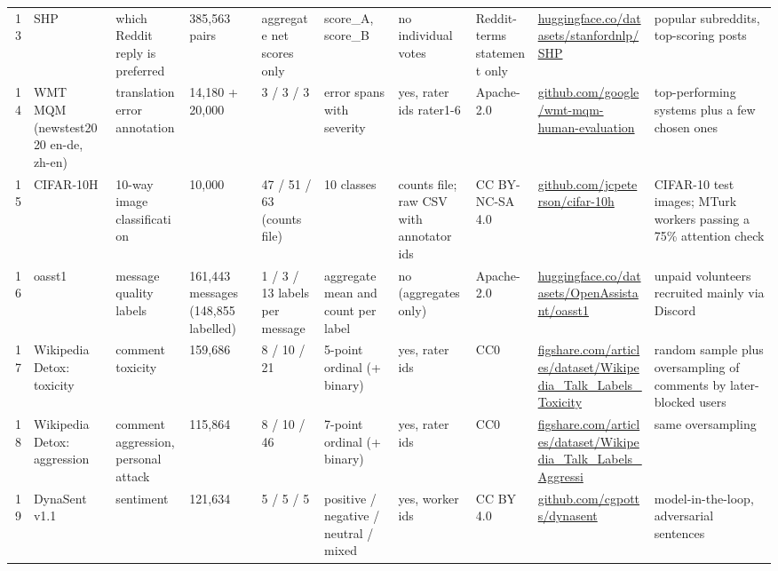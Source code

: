 \documentclass[10pt]{article}
\begin{document}
\begin{longtable}{@{}r p{1.15in} p{1.0in} p{0.75in} p{0.8in} p{0.8in} p{0.9in} p{0.8in} p{1.2in} p{1.5in}@{}}
13 & SHP & which Reddit reply is preferred & 385,563 pairs & aggregate net scores only & score\_A, score\_B & no individual votes & Reddit-terms statement only & \href{https://huggingface.co/datasets/stanfordnlp/SHP}{huggingface.co/\allowbreak{}datasets/\allowbreak{}stanfordnlp/\allowbreak{}SHP} & popular subreddits, top-scoring posts \\
14 & WMT MQM (newstest2020 en-de, zh-en) & translation error annotation & 14,180 + 20,000 & 3 / 3 / 3 & error spans with severity & yes, rater ids rater1-6 & Apache-2.0 & \href{https://github.com/google/wmt-mqm-human-evaluation}{github.com/\allowbreak{}google/\allowbreak{}wmt-\allowbreak{}mqm-\allowbreak{}human-\allowbreak{}evaluation} & top-performing systems plus a few chosen ones \\
15 & CIFAR-10H & 10-way image classification & 10,000 & 47 / 51 / 63 (counts file) & 10 classes & counts file; raw CSV with annotator ids & CC BY-NC-SA 4.0 & \href{https://github.com/jcpeterson/cifar-10h}{github.com/\allowbreak{}jcpeterson/\allowbreak{}cifar-\allowbreak{}10h} & CIFAR-10 test images; MTurk workers passing a 75\% attention check \\
16 & oasst1 & message quality labels & 161,443 messages (148,855 labelled) & 1 / 3 / 13 labels per message & aggregate mean and count per label & no (aggregates only) & Apache-2.0 & \href{https://huggingface.co/datasets/OpenAssistant/oasst1}{huggingface.co/\allowbreak{}datasets/\allowbreak{}OpenAssistant/\allowbreak{}oasst1} & unpaid volunteers recruited mainly via Discord \\
17 & Wikipedia Detox: toxicity & comment toxicity & 159,686 & 8 / 10 / 21 & 5-point ordinal (+ binary) & yes, rater ids & CC0 & \href{https://figshare.com/articles/dataset/Wikipedia_Talk_Labels_Toxicity/4563973}{figshare.com/\allowbreak{}articles/\allowbreak{}dataset/\allowbreak{}Wikipedia\_Talk\_Labels\_Toxicity} & random sample plus oversampling of comments by later-blocked users \\
18 & Wikipedia Detox: aggression & comment aggression, personal attack & 115,864 & 8 / 10 / 46 & 7-point ordinal (+ binary) & yes, rater ids & CC0 & \href{https://figshare.com/articles/dataset/Wikipedia_Talk_Labels_Aggression/4267550}{figshare.com/\allowbreak{}articles/\allowbreak{}dataset/\allowbreak{}Wikipedia\_Talk\_Labels\_Aggressi} & same oversampling \\
19 & DynaSent v1.1 & sentiment & 121,634 & 5 / 5 / 5 & positive / negative / neutral / mixed & yes, worker ids & CC BY 4.0 & \href{https://github.com/cgpotts/dynasent}{github.com/\allowbreak{}cgpotts/\allowbreak{}dynasent} & model-in-the-loop, adversarial sentences \\

\end{longtable}
\end{document}
